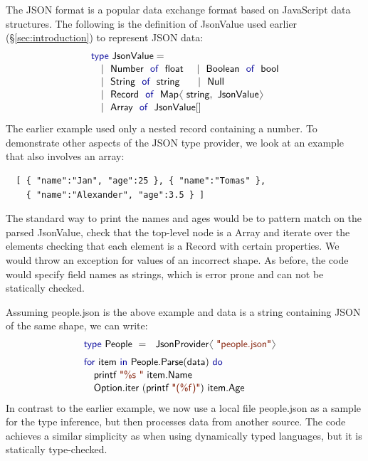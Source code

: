 \documentclass[10pt,preprint,clearpagebib]{sigplanconf}
\newcommand{\langl}{\begin{picture}(4.5,7)
\put(1.1,2.5){\rotatebox{60}{\line(1,0){5.5}}}
\put(1.1,2.5){\rotatebox{300}{\line(1,0){5.5}}}
\end{picture}}
\newcommand{\rangl}{\begin{picture}(4.5,7)
\put(.9,2.5){\rotatebox{120}{\line(1,0){5.5}}}
\put(.9,2.5){\rotatebox{240}{\line(1,0){5.5}}}
\end{picture}}
\newcommand{\kvd}[1]{\textnormal{\textcolor{kvdclr}{\sffamily #1}}}
\newcommand{\str}[1]{\textnormal{\textcolor{strclr}{\sffamily "#1"}}}
\newcommand{\strf}[1]{\textnormal{\textcolor{strclr}{\sffamily #1}}}
\newcommand{\ident}[1]{\textnormal{\sffamily #1}}
\begin{document}
The JSON format is a popular data exchange format based on 
JavaScript data structures. The following is the definition of \ident{JsonValue} 
used earlier (\S\ref{sec:introduction}) to represent JSON data:
%
\begin{equation*}
\begin{array}{l}
 \kvd{type}~\ident{JsonValue} = \\[0.1em]
 \quad|~ \ident{Number}~\kvd{of}~\ident{float} ~~~~|~ \ident{Boolean}~\kvd{of}~\ident{bool} \\[0.1em]
 \quad|~ \ident{String}~\kvd{of}~\ident{string} ~~~~~\, |~ \ident{Null} \\[0.1em]
 \quad|~ \ident{Record}~\kvd{of}~\ident{Map}\langl\ident{string}, \ident{JsonValue}\rangl \\[0.1em]
 \quad|~ \ident{Array}~\kvd{of}~\ident{JsonValue}[] \\[0.1em]
\end{array}
\end{equation*}
%
The earlier example used only a nested record containing a number. To demonstrate other 
aspects of the JSON type provider, we look at an example that also involves an array:
%
{\small{
\begin{verbatim}
  [ { "name":"Jan", "age":25 }, { "name":"Tomas" },
    { "name":"Alexander", "age":3.5 } ]
\end{verbatim}
}}
%
\noindent
The standard way to print the names and ages would be to pattern match on the parsed 
\ident{JsonValue}, check that the top-level node is a \ident{Array} and iterate over the elements 
checking that each element is a \ident{Record} with certain properties. We would throw an exception 
for values of an incorrect shape. As before, the code would specify field names as strings, which 
is error prone and can not be statically checked.

Assuming \strf{people.json} is the above example and \ident{data} is a string containing
JSON of the same shape, we can write:
%
\begin{equation*}
\begin{array}{l}
 \kvd{type}~\ident{People}~=~\ident{JsonProvider}\langl\str{people.json}\rangl\hspace{1em} \\[0.6em]
 \kvd{for}~\ident{item}~\kvd{in}~\ident{People.Parse}(\ident{data})~\kvd{do}\\[0.1em]
 \quad\ident{printf}~\str{\%s }~\ident{item.Name}\\[0.1em]
 \quad\ident{Option.iter}~(\ident{printf}~\str{(\%f)})~\ident{item.Age}
\end{array}
\end{equation*}
%
In contrast to the earlier example, we now use a local file \strf{people.json} as a sample for 
the type inference, but then processes data from another source. The code achieves a similar 
simplicity as when using dynamically typed languages, but it is statically type-checked.
\end{document}
